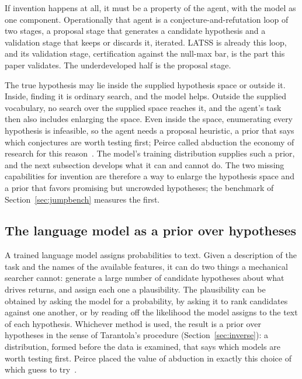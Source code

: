 \documentclass[11pt]{article}
\begin{document}
If invention happens at all, it must be a property of the agent, with the model as one component.
Operationally that agent is a conjecture-and-refutation loop of two stages, a proposal stage that
generates a candidate hypothesis and a validation stage that keeps or discards it, iterated. LATSS is
already this loop, and its validation stage, certification against the null-max bar, is the part this
paper validates. The underdeveloped half is the proposal stage.

The true hypothesis may lie inside the supplied hypothesis space or outside it. Inside, finding it is
ordinary search, and the model helps. Outside the supplied vocabulary, no search over the supplied space
reaches it, and the agent's task then also includes enlarging the space. Even inside the space,
enumerating every hypothesis is infeasible, so the agent needs a proposal heuristic, a prior that says
which conjectures are worth testing first; Peirce called abduction the economy of research for this
reason~\cite{peirce}. The model's training distribution supplies such a prior, and the next subsection
develops what it can and cannot do. The two missing capabilities for invention are therefore a way to
enlarge the hypothesis space and a prior that favors promising but uncrowded hypotheses; the benchmark of
Section~\ref{sec:jumpbench} measures the first.

\subsection{The language model as a prior over hypotheses}
\label{sec:prior}

A trained language model assigns probabilities to text. Given a description of the task and the names
of the available features, it can do two things a mechanical searcher cannot: generate a large number of
candidate hypotheses about what drives returns, and assign each one a plausibility. The plausibility can
be obtained by asking the model for a probability, by asking it to rank candidates against one another,
or by reading off the likelihood the model assigns to the text of each hypothesis. Whichever method is
used, the result is a prior over hypotheses in the sense of Tarantola's procedure
(Section~\ref{sec:inverse}): a distribution, formed before the data is examined, that says which models
are worth testing first. Peirce placed the value of abduction in exactly this choice of which guess to
try~\cite{peirce}.
\end{document}
